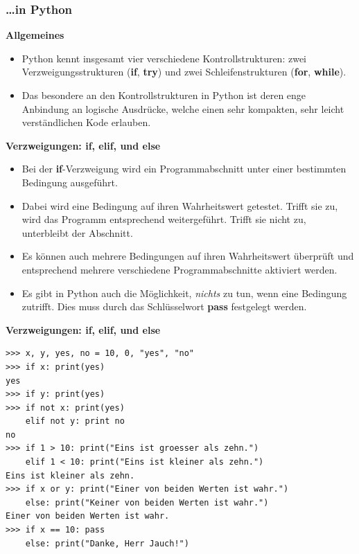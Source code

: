 \subsubsection{\ldots in Python}

\par\noindent\textbf{Allgemeines}

\begin{itemize}
\itemsep1pt\parskip0pt
\item
  {Python kennt insgesamt vier verschiedene Kontrollstrukturen: zwei
  Verzweigungsstrukturen (\textbf{if}, \textbf{try}) und zwei
  Schleifenstrukturen (\textbf{for}, \textbf{while}).}
\item
  {Das besondere an den Kontrollstrukturen in Python ist deren enge
  Anbindung an logische Ausdrücke, welche einen sehr kompakten, sehr
  leicht verständlichen Kode erlauben.}
\end{itemize}


\par\noindent\textbf{Verzweigungen: if, elif, und else}

\begin{itemize}
\itemsep1pt\parskip0pt
\item
  {Bei der \textbf{if}-Verzweigung wird ein Programmabschnitt unter
  einer bestimmten Bedingung ausgeführt.}
\item
  {Dabei wird eine Bedingung auf ihren Wahrheitswert getestet. Trifft
  sie zu, wird das Programm entsprechend weitergeführt. Trifft sie nicht
  zu, unterbleibt der Abschnitt.}
\item
  {Es können auch mehrere Bedingungen auf ihren Wahrheitswert überprüft
  und entsprechend mehrere verschiedene Programmabschnitte aktiviert
  werden.}
\item
  {Es gibt in Python auch die Möglichkeit, \emph{nichts} zu tun, wenn
  eine Bedingung zutrifft. Dies muss durch das Schlüsselwort
  \textbf{pass} festgelegt werden.}
\end{itemize}



\par\noindent\textbf{Verzweigungen: if, elif, und else}

\begin{verbatim}
>>> x, y, yes, no = 10, 0, "yes", "no"
>>> if x: print(yes)
yes
>>> if y: print(yes)
>>> if not x: print(yes)
    elif not y: print no
no
>>> if 1 > 10: print("Eins ist groesser als zehn.")
    elif 1 < 10: print("Eins ist kleiner als zehn.")
Eins ist kleiner als zehn.
>>> if x or y: print("Einer von beiden Werten ist wahr.")
    else: print("Keiner von beiden Werten ist wahr.")
Einer von beiden Werten ist wahr.
>>> if x == 10: pass
    else: print("Danke, Herr Jauch!")
\end{verbatim}


